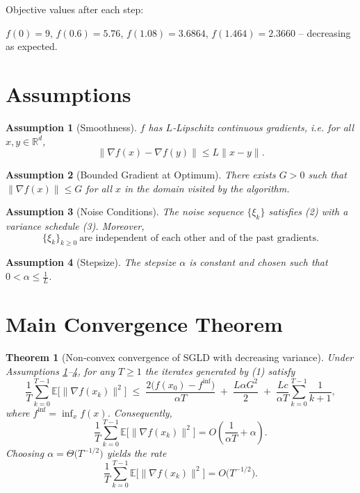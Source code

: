 \documentclass{article}
\newtheorem{theorem}{Theorem}
\newtheorem{assumption}{Assumption}
\newcommand{\E}{\mathbb{E}}
\newcommand{\R}{\mathbb{R}}
\begin{document}
Objective values after each step:  

$f(0)=9$, $f(0.6)=5.76$, $f(1.08)=3.6864$, $f(1.464)=2.3660$ – decreasing as expected.

\newpage
\section*{Assumptions}
\begin{assumption}[Smoothness]\label{ass:smooth}
$f$ has $L$‑Lipschitz continuous gradients, i.e. for all $x,y\in\R^{d}$,
\[
\|\nabla f(x)-\nabla f(y)\|\le L\|x-y\|.
\tag{A1}
\]
\end{assumption}

\begin{assumption}[Bounded Gradient at Optimum]\label{ass:gradbound}
There exists $G>0$ such that $\|\nabla f(x)\|\le G$ for all $x$ in the domain visited by the algorithm.
\end{assumption}

\begin{assumption}[Noise Conditions]\label{ass:noise}
The noise sequence $\{\xi_k\}$ satisfies (2) with a variance schedule (3). Moreover,
\[
\{\xi_k\}_{k\ge0}\ \text{are independent of each other and of the past gradients}.
\tag{A3}
\]
\end{assumption}

\begin{assumption}[Stepsize]\label{ass:stepsize}
The stepsize $\alpha$ is constant and chosen such that $0<\alpha\le \frac{1}{L}$.
\end{assumption}

\section*{Main Convergence Theorem}
\begin{theorem}[Non‑convex convergence of SGLD with decreasing variance]\label{thm:main}
Under Assumptions \ref{ass:smooth}–\ref{ass:stepsize}, for any $T\ge1$ the iterates generated by (1) satisfy  
\[
\frac{1}{T}\sum_{k=0}^{T-1}\E\bigl[\|\nabla f(x_k)\|^{2}\bigr]
\;\le\;
\frac{2\bigl(f(x_0)-f^{\inf}\bigr)}{\alpha T}
\;+\;
\frac{L\alpha G^{2}}{2}
\;+\;
\frac{Lc}{\alpha T}\sum_{k=0}^{T-1}\frac{1}{k+1},
\tag{4}
\]
where $f^{\inf}=\inf_{x}f(x)$. Consequently,
\[
\frac{1}{T}\sum_{k=0}^{T-1}\E\bigl[\|\nabla f(x_k)\|^{2}\bigr]
= O\!\left(\frac{1}{\alpha T}+\alpha\right).
\]
Choosing $\alpha = \Theta\!\bigl(T^{-1/2}\bigr)$ yields the rate 
\[
\frac{1}{T}\sum_{k=0}^{T-1}\E\bigl[\|\nabla f(x_k)\|^{2}\bigr]=O\!\bigl(T^{-1/2}\bigr).
\]
\end{theorem}
\end{document}
